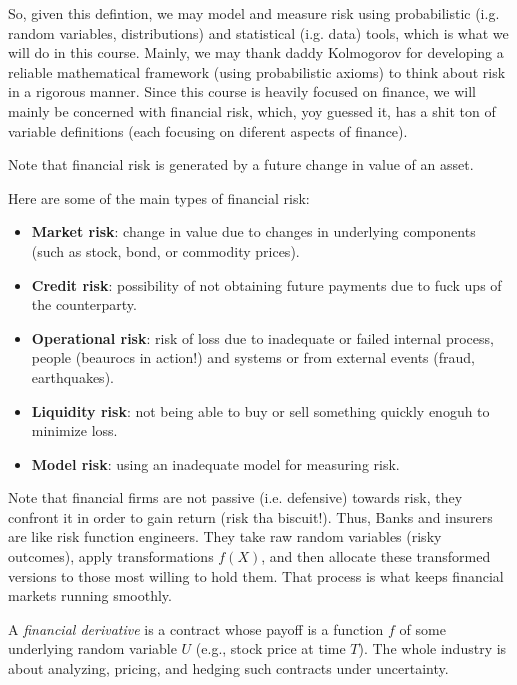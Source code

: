 So, given this defintion, we may model and measure risk using probabilistic (i.g. random variables, distributions) and statistical (i.g. data) tools, which is what we will do in this course. Mainly, we may thank daddy Kolmogorov for developing
a reliable mathematical framework (using probabilistic axioms) to think about risk in a rigorous manner. Since this course is heavily focused on finance, we will mainly be concerned with financial risk, which, yoy guessed it, has a shit ton of
variable definitions (each focusing on diferent aspects of finance).

\begin{remark}
    Note that financial risk is generated by a future change in value of an asset.
\end{remark}

\vspace{0.2cm}

Here are some of the main types of financial risk:

\begin{itemize}
    \item \textbf{Market risk}: change in value due to changes in underlying components (such as
    stock, bond, or commodity prices).
    \item \textbf{Credit risk}: possibility of not obtaining future payments due to fuck ups of the counterparty.
    \item \textbf{Operational risk}: risk of loss due to inadequate or failed internal process, people (beaurocs in action!) and systems  or from external events (fraud, earthquakes).
    \item \textbf{Liquidity risk}: not being able to buy or sell something quickly enoguh to minimize loss.
    \item \textbf{Model risk}: using an inadequate model for measuring risk.
\end{itemize}

\vspace{0.2cm}

Note that financial firms are not passive (i.e. defensive) towards risk, they confront it in order to gain return (risk tha biscuit!). Thus, Banks and insurers are like risk function engineers. They take raw random variables (risky outcomes), apply transformations $f(X)$,
 and then allocate these transformed versions to those most willing to hold them. That process is what keeps financial markets running smoothly.

 \begin{definition}
    A \textit{financial derivative} is a contract whose payoff is a function $f$ of some underlying random variable $U$ (e.g., stock price at time $T$). The whole industry is about analyzing, pricing, and hedging such contracts under uncertainty.
 \end{definition}

 \vspace{0.2cm}

 